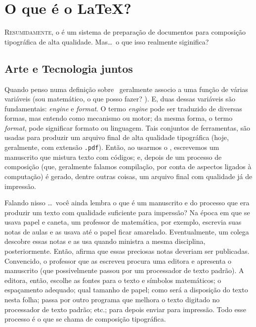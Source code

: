 \chapter{O que é o \textrm{\LaTeX}?}
\label{cap:latex}

\lettrine[lines=3]{\color{azulUFRB} \initial R}{esumidamente}, o  
é um \textsf{sistema} de preparação de documentos para composição tipográfica 
de alta qualidade. 
Mas\ldots\ o que isso realmente siginifica?  

\section{Arte e Tecnologia juntos} %

Quando penso numa definição sobre \latex\ geralmente associo a uma função de 
várias variáveis (sou matemático, o que posso fazer? ). 
E, duas dessas variáveis são fundamentais: \textit{engine} e \textit{format}.
O termo \textit{engine} pode ser traduzido de diversas formas, mas entendo como 
\textsf{mecanismo} ou \textsf{motor}; da mesma forma, o termo \textit{format}, 
pode significar \textsf{formato} ou \textsf{linguagem}. 
Tais conjuntos de ferramentas, são usadas para produzir um arquivo final de alta 
qualidade tipográfica (hoje, geralmente, com extensão \texttt{.pdf}). 
Então, ao usarmos o \latex, escrevemos um \textsf{manuscrito} que mistura texto 
com códigos; e, depois de um processo de \textsf{composição} (que, geralmente 
falamos \textsf{compilação}, por conta de aspectos ligados à computação) é gerado, 
dentre outras coisas, um arquivo final com qualidade já de impressão. 

Falando nisso \ldots\ você ainda lembra o que é um \textsf{manuscrito} e do 
processo que era produzir um texto com qualidade suficiente para imperssão? 
Na época em que se usava papel e caneta, um professor de matemática, por exemplo, 
escrevia suas notas de aulas e as usava até o papel ficar amarelado. 
Eventualmente, um colega descobre essas notas e as usa quando ministra a mesma 
disciplina, posteriormente. 
Então, afirma que essas preciosas notas deveriam ser publicadas. 
Convencido, o professor que as escreveu procura uma editora e apresenta o 
manuscrito (que possivelmente passou por um processador de texto padrão). 
A editora, então, escolhe as fontes para o texto e símbolos matemáticos; o 
espaçamento adequado; qual tamanho de papel; como será a disposição do texto 
nesta folha; passa por outro programa que melhora o texto digitado no 
processador de texto padrão; etc.; para depois enviar para impressão. 
Todo esse processo é o que se chama de \textsf{composição tipográfica}.

